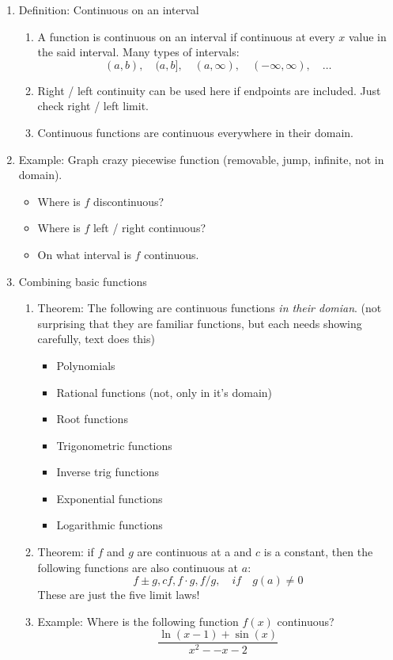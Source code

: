 \documentclass{article}
\begin{document}
\begin{enumerate}
\item Definition: Continuous on an interval
\begin{enumerate}
\item A function is continuous on an interval if continuous at every $x$ value in the said interval. Many types of intervals:
\[
(a,b), \quad
(a,b], \quad
(a,\infty), \quad
(-\infty,\infty), \quad \dots
\]
\item Right / left continuity can be used here if endpoints are included. Just check right / left limit.
\item Continuous functions are continuous everywhere in their domain.
\end{enumerate}

\item Example: Graph crazy piecewise function (removable, jump, infinite, not in domain).  
\begin{itemize}
\item Where is $f$ discontinuous?
\item Where is $f$ left / right continuous?
\item On what interval is $f$ continuous.
\end{itemize}

\item Combining basic functions
\begin{enumerate}
\item Theorem: The following are continuous functions \emph{in their domian}. (not surprising that they are familiar functions, but each needs showing carefully, text does this)
\begin{itemize}
\item Polynomials
\item Rational functions (not, only in it's domain)
\item Root functions
\item Trigonometric functions
\item Inverse trig functions
\item Exponential functions
\item Logarithmic functions
\end{itemize}

\item Theorem:  if $f$ and $g$ are continuous at a and $c$ is a constant, then the following functions are also continuous at $a$:
$$
f\pm g, cf, f\cdot g, f/g,\quad if \quad g(a) \neq 0 
$$
These are just the five limit laws!
\item Example: Where is the following function $f(x)$ continuous?
$$
\frac{\ln(x-1)+\sin(x)}{x^2--x-2}
$$
\end{enumerate}


\end{enumerate}
\end{document}
